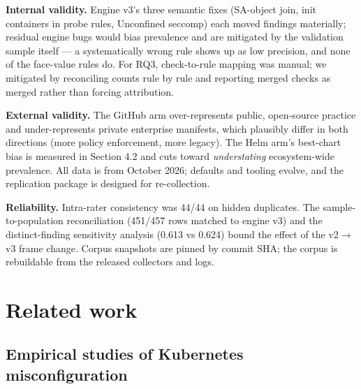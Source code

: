\documentclass[pdflatex,sn-basic]{sn-jnl}
\begin{document}
\textbf{Internal validity.} Engine v3's three semantic fixes (SA-object
join, init containers in probe rules, Unconfined seccomp) each moved
findings materially; residual engine bugs would bias prevalence and are
mitigated by the validation sample itself --- a systematically wrong
rule shows up as low precision, and none of the face-value rules do. For
RQ3, check-to-rule mapping was manual; we mitigated by reconciling
counts rule by rule and reporting merged checks as merged rather than
forcing attribution.

\textbf{External validity.} The GitHub arm over-represents public,
open-source practice and under-represents private enterprise manifests,
which plausibly differ in both directions (more policy enforcement, more
legacy). The Helm arm's best-chart bias is measured in Section 4.2 and
cuts toward \emph{understating} ecosystem-wide prevalence. All data is
from October 2026; defaults and tooling evolve, and the replication
package is designed for re-collection.

\textbf{Reliability.} Intra-rater consistency was 44/44 on hidden
duplicates. The sample-to-population reconciliation (451/457 rows
matched to engine v3) and the distinct-finding sensitivity analysis
(0.613 vs 0.624) bound the effect of the v2$\rightarrow$v3 frame change. Corpus
snapshots are pinned by commit SHA; the corpus is rebuildable from the
released collectors and logs.

\hypertarget{related-work}{%
\section{Related work}\label{related-work}}

\hypertarget{empirical-studies-of-kubernetes-misconfiguration}{%
\subsection{Empirical studies of Kubernetes
misconfiguration}\label{empirical-studies-of-kubernetes-misconfiguration}}
\end{document}
